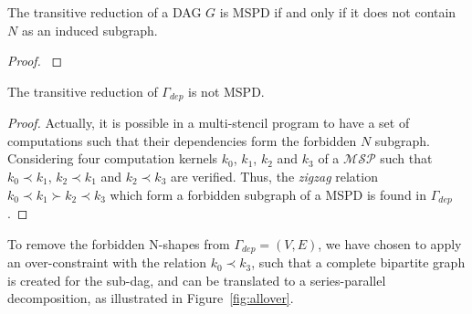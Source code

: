\begin{myth}
The transitive reduction of a DAG $G$ is MSPD if and only if it does not contain $N$ as an induced subgraph.
\end{myth}

\begin{proof} \cite{Valdes:1979:RSP:800135.804393} \end{proof}

\begin{myprop}
The transitive reduction of $\Gamma_{dep}$ is not MSPD.
\end{myprop}

\begin{proof}
Actually, it is possible in a multi-stencil program to have a set of computations such that their dependencies form the forbidden $N$ subgraph. Considering four computation kernels $k_0$, $k_1$, $k_2$ and $k_3$ of a $\mathcal{MSP}$ such that $k_0 \prec k_1$, $k_2 \prec k_1$ and $k_2 \prec k_3$ are verified. Thus, the \emph{zigzag} relation $k_0 \prec k_1 \succ k_2 \prec k_3$ which form a forbidden subgraph of a MSPD is found in $\Gamma_{dep}$.
\end{proof}

To remove the forbidden N-shapes from $\Gamma_{dep}=(V,E)$, we have chosen to apply an over-constraint with the relation $k_0 \prec k_3$, such that a complete bipartite graph is created for the sub-dag, and can be translated to a series-parallel decomposition, as illustrated in Figure~\ref{fig:allover}. 

